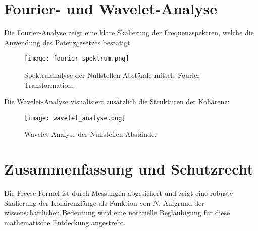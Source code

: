 \documentclass[a4paper,12pt]{article}
\begin{document}
\section{Fourier- und Wavelet-Analyse}
Die Fourier-Analyse zeigt eine klare Skalierung der Frequenzspektren, welche die Anwendung des Potenzgesetzes bestätigt. 

\begin{figure}[h]
    \centering
    \texttt{[image: fourier\_spektrum.png]}
    \caption{Spektralanalyse der Nullstellen-Abstände mittels Fourier-Transformation.}
\end{figure}

Die Wavelet-Analyse visualisiert zusätzlich die Strukturen der Kohärenz:

\begin{figure}[h]
    \centering
    \texttt{[image: wavelet\_analyse.png]}
    \caption{Wavelet-Analyse der Nullstellen-Abstände.}
\end{figure}

\section{Zusammenfassung und Schutzrecht}
Die Freese-Formel ist durch Messungen abgesichert und zeigt eine robuste Skalierung der Kohärenzlänge als Funktion von \(N\). Aufgrund der wissenschaftlichen Bedeutung wird eine notarielle Beglaubigung für diese mathematische Entdeckung angestrebt.
\end{document}
